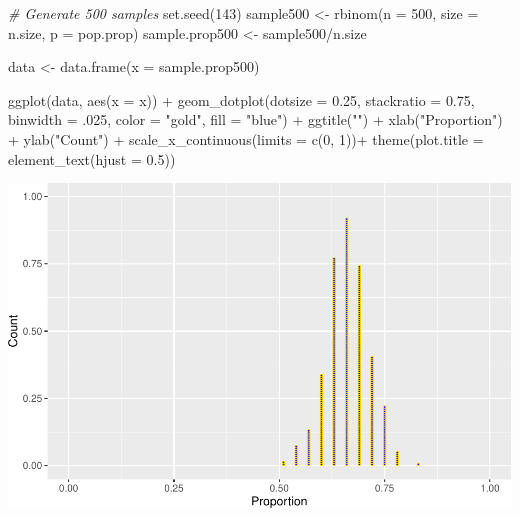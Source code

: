 \documentclass[
]{book}
\newenvironment{Shaded}{\begin{snugshade}}{\end{snugshade}}
\newcommand{\AttributeTok}[1]{\textcolor[rgb]{0.77,0.63,0.00}{#1}}
\newcommand{\CommentTok}[1]{\textcolor[rgb]{0.56,0.35,0.01}{\textit{#1}}}
\newcommand{\DecValTok}[1]{\textcolor[rgb]{0.00,0.00,0.81}{#1}}
\newcommand{\FloatTok}[1]{\textcolor[rgb]{0.00,0.00,0.81}{#1}}
\newcommand{\FunctionTok}[1]{\textcolor[rgb]{0.00,0.00,0.00}{#1}}
\newcommand{\NormalTok}[1]{#1}
\newcommand{\OtherTok}[1]{\textcolor[rgb]{0.56,0.35,0.01}{#1}}
\newcommand{\SpecialCharTok}[1]{\textcolor[rgb]{0.00,0.00,0.00}{#1}}
\newcommand{\StringTok}[1]{\textcolor[rgb]{0.31,0.60,0.02}{#1}}
\begin{document}
\begin{Shaded}
\begin{Highlighting}[]
\CommentTok{\# Generate 500 samples}
\FunctionTok{set.seed}\NormalTok{(}\DecValTok{143}\NormalTok{)}
\NormalTok{sample500 }\OtherTok{\textless{}{-}} \FunctionTok{rbinom}\NormalTok{(}\AttributeTok{n =} \DecValTok{500}\NormalTok{, }\AttributeTok{size =}\NormalTok{ n.size, }\AttributeTok{p =}\NormalTok{ pop.prop)  }
\NormalTok{sample.prop500 }\OtherTok{\textless{}{-}}\NormalTok{ sample500}\SpecialCharTok{/}\NormalTok{n.size }

\NormalTok{data }\OtherTok{\textless{}{-}} \FunctionTok{data.frame}\NormalTok{(}\AttributeTok{x =}\NormalTok{ sample.prop500)}

\FunctionTok{ggplot}\NormalTok{(data, }\FunctionTok{aes}\NormalTok{(}\AttributeTok{x =}\NormalTok{ x)) }\SpecialCharTok{+}
  \FunctionTok{geom\_dotplot}\NormalTok{(}\AttributeTok{dotsize =} \FloatTok{0.25}\NormalTok{,}
               \AttributeTok{stackratio =} \FloatTok{0.75}\NormalTok{,}
               \AttributeTok{binwidth =}\NormalTok{ .}\DecValTok{025}\NormalTok{,}
               \AttributeTok{color =} \StringTok{"gold"}\NormalTok{,}
               \AttributeTok{fill =} \StringTok{"blue"}\NormalTok{) }\SpecialCharTok{+}
  \FunctionTok{ggtitle}\NormalTok{(}\StringTok{""}\NormalTok{) }\SpecialCharTok{+}  \FunctionTok{xlab}\NormalTok{(}\StringTok{"Proportion"}\NormalTok{) }\SpecialCharTok{+} \FunctionTok{ylab}\NormalTok{(}\StringTok{"Count"}\NormalTok{) }\SpecialCharTok{+}
  \FunctionTok{scale\_x\_continuous}\NormalTok{(}\AttributeTok{limits =} \FunctionTok{c}\NormalTok{(}\DecValTok{0}\NormalTok{, }\DecValTok{1}\NormalTok{))}\SpecialCharTok{+} 
  \FunctionTok{theme}\NormalTok{(}\AttributeTok{plot.title =} \FunctionTok{element\_text}\NormalTok{(}\AttributeTok{hjust =} \FloatTok{0.5}\NormalTok{))}
\end{Highlighting}
\end{Shaded}

\includegraphics[width=1\linewidth]{Class_Activity_7_files/figure-latex/unnamed-chunk-12-1}
\end{document}
